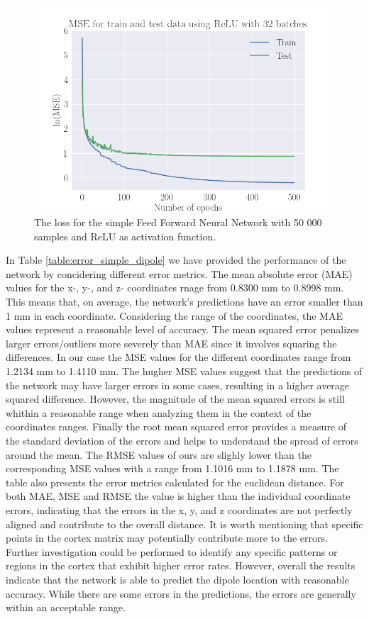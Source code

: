 \documentclass[a4paper, UKenglish, 11pt]{uiomaster}
\begin{document}
\begin{figure}[!htb]
    \centering
    \includegraphics[width=\linewidth]{figures/MSE_simple_dipole_lr0.001_RELU_500_50000_ReLU_32_500_N_dipoles_1.png}
    \caption{The loss for the simple Feed Forward Neural Network with 50 000 samples and ReLU as activation function. }
    \label{fig:single_dipole_accuracy}
\end{figure}

In Table \ref{table:error_simple_dipole} we have provided the performance of the network by concidering different error metrics. The mean absolute error (MAE) values for the x-, y-, and z- coordinates rnage from 0.8300 mm to 0.8998 mm. This means that, on average, the network's predictions have an error smaller than 1 mm in each coordinate. Considering the range of the coordinates, the MAE values represent a reasonable level of accuracy. The mean squared error penalizes larger errors/outliers more severely than MAE since it involves squaring the differences. In our case the MSE values for the different coordinates range from 1.2134 mm to 1.4110 mm. The hugher MSE values suggest that the predictions of the network may have larger errors in some cases, resulting in a higher average squared difference. However, the magnitude of the mean squared errors is still whithin a reasonable range when analyzing them in the context of the coordinates ranges. Finally the root mean squared error provides a measure of the standard deviation of the errors and helps to understand the spread of errors around the mean. The RMSE values of ours are slighly lower than the corresponding MSE values with a range from 1.1016 mm to 1.1878 mm. The table also presents the error metrics calculated for the euclidean distance. For both MAE, MSE and RMSE the value is higher than the individual coordinate errors, indicating that the errors in the x, y, and z coordinates are not perfectly aligned and contribute to the overall distance. It is worth mentioning that specific points in the cortex matrix may potentially contribute more to the errors. Further investigation could be performed to identify any specific patterns or regions in the cortex that exhibit higher error rates. However, overall the results indicate that the network is able to predict the dipole location with reasonable accuracy. While there are some errors in the predictions, the errors are generally within an acceptable range.
\end{document}
